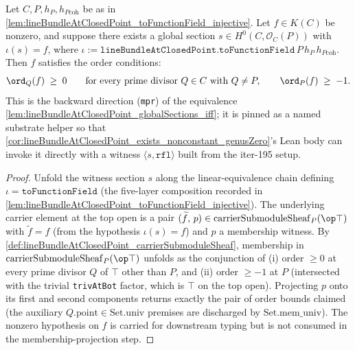 \begin{lemma}


  \label{lem:lineBundleAtClosedPoint_globalSections_iff_mpr}
  Let \(C, P, h_P, h_{P\mathrm{coh}}\) be as in
  \cref{lem:lineBundleAtClosedPoint_toFunctionField_injective}. Let
  \(f \in K(C)\) be nonzero, and suppose there exists a global section
  \(s \in H^0(C, \mathcal O_C(P))\) with \(\iota(s) = f\), where
  \(\iota:=
  \texttt{lineBundleAtClosedPoint.toFunctionField}\,P\,h_P\,h_{P\mathrm{coh}}\).
  Then \(f\) satisfies the order conditions:
  \[
    \ord_Q(f) \;\ge\; 0
    \qquad \text{for every prime divisor } Q\in C \text{ with } Q\ne P,
    \qquad
    \ord_P(f) \;\ge\; -1.
  \]
  This is the backward direction (\texttt{mpr}) of the equivalence
  \cref{lem:lineBundleAtClosedPoint_globalSections_iff}; it is pinned as
  a named substrate helper so that
  \cref{cor:lineBundleAtClosedPoint_exists_nonconstant_genusZero}'s Lean
  body can invoke it directly with a witness
  \(\langle s, \mathtt{rfl}\rangle\) built from the iter-195 setup.
\end{lemma}

\begin{proof}
  Unfold the witness section \(s\) along the linear-equivalence chain
  defining \(\iota = \texttt{toFunctionField}\) (the five-layer
  composition recorded in
  \cref{lem:lineBundleAtClosedPoint_toFunctionField_injective}). The
  underlying carrier element at the top open is a pair
  \((\widetilde f,\,p) \in \mathrm{carrierSubmoduleSheaf}_P(\op\top)\)
  with \(\widetilde f = f\) (from the hypothesis \(\iota(s) = f\)) and
  \(p\) a membership witness. By
  \cref{def:lineBundleAtClosedPoint_carrierSubmoduleSheaf}, membership
  in \(\mathrm{carrierSubmoduleSheaf}_P(\op\top)\) unfolds as the
  conjunction of (i) order \(\ge 0\) at every prime divisor \(Q\) of
  \(\top\) other than \(P\), and (ii) order \(\ge -1\) at \(P\)
  (intersected with the trivial \texttt{trivAtBot} factor, which is
  \(\top\) on the top open). Projecting \(p\) onto its first and
  second components returns exactly the pair of order bounds claimed
  (the auxiliary \(Q.\mathrm{point}\in \mathrm{Set.univ}\) premises
  are discharged by \(\mathrm{Set.mem\_univ}\)). The nonzero hypothesis
  on \(f\) is carried for downstream typing but is not consumed in the
  membership-projection step.
\end{proof}

